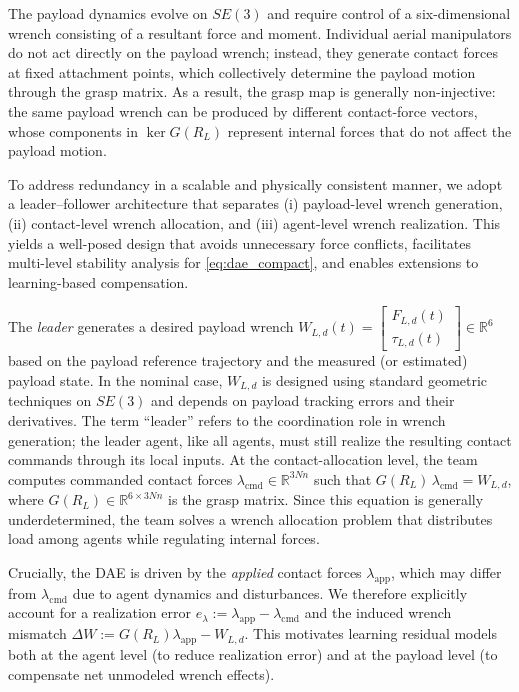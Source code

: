\documentclass[letterpaper, 10 pt, conference]{ieeeconf}  %
\newcommand{\0}{\matr{0}}
\begin{document}
The payload dynamics evolve on $SE(3)$ and require control of a six-dimensional wrench consisting of a resultant force and moment.
Individual aerial manipulators do not act directly on the payload wrench; instead, they generate contact forces at fixed attachment points, which collectively determine the payload motion through the grasp matrix.
As a result, the grasp map is generally non-injective: the same payload wrench can be produced by different contact-force vectors, whose components in $\ker G(R_L)$ represent internal forces that do not affect the payload motion.

To address redundancy in a scalable and physically consistent manner,
we adopt a leader--follower architecture that separates
(i) payload-level wrench generation, (ii) contact-level wrench allocation, and
(iii) agent-level wrench realization.
This yields a well-posed design that avoids unnecessary force conflicts,
facilitates multi-level stability analysis for \eqref{eq:dae_compact}, and enables 
extensions to learning-based compensation.

The \emph{leader} generates a desired payload wrench
$W_{L,d}(t)=\begin{bmatrix} F_{L,d}(t)\\ \tau_{L,d}(t)\end{bmatrix}\in\mathbb R^6$
based on the payload reference trajectory and the measured (or estimated) payload state.
In the nominal case, $W_{L,d}$ is designed using standard geometric techniques on $SE(3)$
and depends on payload tracking errors and their derivatives.
The term ``leader'' refers to the coordination role in wrench generation; the leader agent,
like all agents, must still realize the resulting contact commands through its local inputs. At the contact-allocation level, the team computes commanded contact forces
$\lambda_{\mathrm{cmd}}\in\mathbb R^{3Nn}$ such that $G(R_L)\,\lambda_{\mathrm{cmd}} = W_{L,d}$, where $G(R_L)\in\mathbb R^{6\times 3Nn}$ is the grasp matrix.
Since this equation is generally underdetermined, the team solves a wrench allocation problem
that distributes load among agents while regulating internal forces.


Crucially, the DAE is driven by the \emph{applied} contact forces $\lambda_{\mathrm{app}}$,
which may differ from $\lambda_{\mathrm{cmd}}$ due to agent dynamics and disturbances.
We therefore explicitly account for a realization error
$e_\lambda := \lambda_{\mathrm{app}}-\lambda_{\mathrm{cmd}}$ and the induced wrench mismatch
$\Delta W := G(R_L)\lambda_{\mathrm{app}}-W_{L,d}$.
This motivates learning residual models both at the agent level (to reduce realization error)
and at the payload level (to compensate net unmodeled wrench effects).
\end{document}
